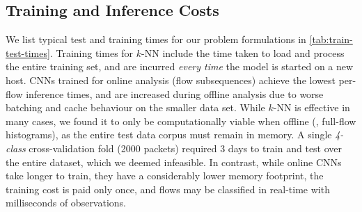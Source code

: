 \subsection{Training and Inference Costs}
\begin{table}[]
    \centering
    \caption{Training and inference costs on our test server.}
    \label{tab:train-test-times}
\end{table}

We list typical test and training times for our problem formulations in \cref{tab:train-test-times}.
Training times for $k$-NN include the time taken to load and process the entire training set, and are incurred \emph{every time} the model is started on a new host.
CNNs trained for online analysis (flow subsequences) achieve the lowest per-flow inference times, and are increased during offline analysis due to worse batching and cache behaviour on the smaller data set.
While $k$-NN is effective in many cases, we found it to only be computationally viable when offline (\ie, full-flow histograms), as the entire test data corpus must remain in memory.
A single \emph{4-class} cross-validation fold (\num{2000} packets) required 3 days to train and test over the entire dataset, which we deemed infeasible.
In contrast, while online CNNs take longer to train, they have a considerably lower memory footprint, the training cost is paid only once, and flows may be classified in real-time with milliseconds of observations.

